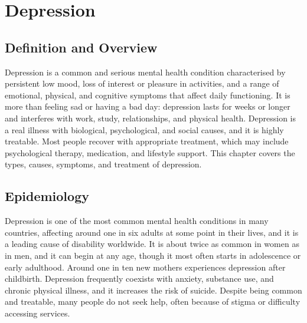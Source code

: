 \chapter{Depression}

\section*{Definition and Overview}
Depression is a common and serious mental health condition characterised by persistent low mood, loss of interest or pleasure in activities, and a range of emotional, physical, and cognitive symptoms that affect daily functioning. It is more than feeling sad or having a bad day: depression lasts for weeks or longer and interferes with work, study, relationships, and physical health. Depression is a real illness with biological, psychological, and social causes, and it is highly treatable. Most people recover with appropriate treatment, which may include psychological therapy, medication, and lifestyle support. This chapter covers the types, causes, symptoms, and treatment of depression.

\section*{Epidemiology}
Depression is one of the most common mental health conditions in many countries, affecting around one in six adults at some point in their lives, and it is a leading cause of disability worldwide. It is about twice as common in women as in men, and it can begin at any age, though it most often starts in adolescence or early adulthood. Around one in ten new mothers experiences depression after childbirth. Depression frequently coexists with anxiety, substance use, and chronic physical illness, and it increases the risk of suicide. Despite being common and treatable, many people do not seek help, often because of stigma or difficulty accessing services.

